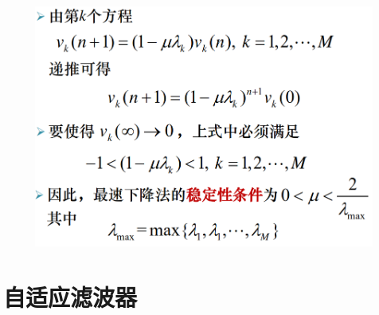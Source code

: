 \documentclass[UTF8]{ctexart} %
\begin{document}
			\begin{figure}[H]
				\centering\includegraphics[scale=0.3]{20.png}
			\end{figure}
			
			
			
			
	\section{自适应滤波器}
		
\end{document}
